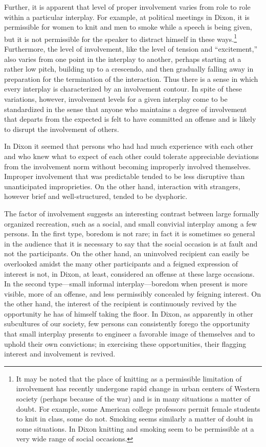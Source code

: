 \documentclass[openany,nobib]{tufte-book}
\begin{document}
Further, it is apparent that level of proper involvement varies from
role to role within a particular interplay. For example, at political
meetings in Dixon, it is permissible for women to knit and men to smoke
while a speech is being given, but it is not permissible for the speaker
to distract himself in these ways.\footnote{It may be noted that the
  place of knitting as a permissible limitation of involvement has
  recently undergone rapid change in urban centers of Western society
  (perhaps because of the war) and is in many situations a matter of
  doubt. For example, some American college professors permit female
  students to knit in class, some do not. Smoking seems similarly a
  matter of doubt in some situations. In Dixon knitting and smoking seem
  to be permissible at a very wide range of social occasions.}
Furthermore, the level of involvement, like the level of tension and
``excitement,'' also varies from one point in the interplay to another,
perhaps starting at a rather low pitch, building up to a crescendo, and
then gradually falling away in preparation for the termination of the
interaction. Thus there is a sense in which every interplay is
characterized by an involvement contour. In spite of these variations,
however, involvement levels for a given interplay come to be
standardized in the sense that anyone who maintains a degree of
involvement that departs from the expected is felt to have committed an
offense and is likely to disrupt the involvement of others.

\newpage In Dixon it seemed that persons who had had much experience with each
other and who knew what to expect of each other could tolerate
appreciable deviations from the involvement norm without becoming
improperly involved themselves. Improper involvement that was
predictable tended to be less disruptive than unanticipated
improprieties. On the other hand, interaction with strangers, however
brief and well-structured, tended to be dysphoric.

The factor of involvement suggests an interesting contrast between large
formally organized recreation, such as a social, and small convivial
interplay among a few persons. In the first type, boredom is not rare;
in fact it is sometimes so general in the audience that it is necessary
to say that the social occasion is at fault and not the participants. On
the other hand, an uninvolved recipient can easily be overlooked amidst
the many other participants and a feigned expression of interest is not,
in Dixon, at least, considered an offense at these large occasions. In
the second type---small informal interplay---boredom when present is
more visible, more of an offense, and less permissibly concealed by
feigning interest. On the other hand, the interest of the recipient is
continuously revived by the opportunity he has of himself taking the
floor. In Dixon, as apparently in other subcultures of our society, few
persons can consistently forego the opportunity that small interplay
presents to engineer a favorable image of themselves and to uphold their
own convictions; in exercising these opportunities, their flagging
interest and involvement is revived.
\end{document}
